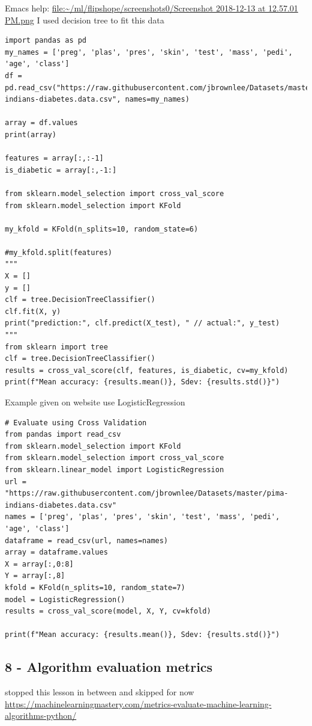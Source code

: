 \documentclass[11pt]{article}
\begin{document}
Emacs help: \href{screenshots0/Screenshot\%202018-12-13\%20at\%2012.57.01\%20PM.png}{file:\textasciitilde{}/ml/flipshope/screenshots0/Screenshot 2018-12-13 at 12.57.01 PM.png}
I used decision tree to fit this data
\begin{verbatim}
import pandas as pd
my_names = ['preg', 'plas', 'pres', 'skin', 'test', 'mass', 'pedi', 'age', 'class']
df = pd.read_csv("https://raw.githubusercontent.com/jbrownlee/Datasets/master/pima-indians-diabetes.data.csv", names=my_names)

array = df.values
print(array)

features = array[:,:-1]
is_diabetic = array[:,-1:]

from sklearn.model_selection import cross_val_score
from sklearn.model_selection import KFold

my_kfold = KFold(n_splits=10, random_state=6)

#my_kfold.split(features)
"""
X = []
y = []
clf = tree.DecisionTreeClassifier()
clf.fit(X, y)
print("prediction:", clf.predict(X_test), " // actual:", y_test)
"""
from sklearn import tree
clf = tree.DecisionTreeClassifier()
results = cross_val_score(clf, features, is_diabetic, cv=my_kfold)
print(f"Mean accuracy: {results.mean()}, Sdev: {results.std()}")
\end{verbatim}
Example given on website use LogisticRegression
\begin{verbatim}
# Evaluate using Cross Validation
from pandas import read_csv
from sklearn.model_selection import KFold
from sklearn.model_selection import cross_val_score
from sklearn.linear_model import LogisticRegression
url = "https://raw.githubusercontent.com/jbrownlee/Datasets/master/pima-indians-diabetes.data.csv"
names = ['preg', 'plas', 'pres', 'skin', 'test', 'mass', 'pedi', 'age', 'class']
dataframe = read_csv(url, names=names)
array = dataframe.values
X = array[:,0:8]
Y = array[:,8]
kfold = KFold(n_splits=10, random_state=7)
model = LogisticRegression()
results = cross_val_score(model, X, Y, cv=kfold)

print(f"Mean accuracy: {results.mean()}, Sdev: {results.std()}")

\end{verbatim}

\subsection{8 - Algorithm evaluation metrics}
\label{sec:org9eceecc}
stopped this lesson in between and skipped for now
\url{https://machinelearningmastery.com/metrics-evaluate-machine-learning-algorithms-python/}
\end{document}
